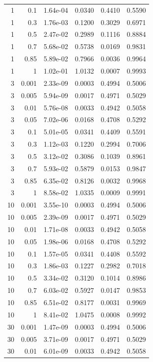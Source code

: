 {\begin{longtable}{rrrrrr}
1 & 0.1 & 1.64e-04 & 0.0340 & 0.4410 & 0.5590 \\
1 & 0.3 & 1.76e-03 & 0.1200 & 0.3029 & 0.6971 \\
1 & 0.5 & 2.47e-02 & 0.2989 & 0.1116 & 0.8884 \\
1 & 0.7 & 5.68e-02 & 0.5738 & 0.0169 & 0.9831 \\
1 & 0.85 & 5.89e-02 & 0.7966 & 0.0036 & 0.9964 \\
1 & 1 & 1.02e-01 & 1.0132 & 0.0007 & 0.9993 \\
3 & 0.001 & 2.33e-09 & 0.0003 & 0.4994 & 0.5006 \\
3 & 0.005 & 5.94e-09 & 0.0017 & 0.4971 & 0.5029 \\
3 & 0.01 & 5.76e-08 & 0.0033 & 0.4942 & 0.5058 \\
3 & 0.05 & 7.02e-06 & 0.0168 & 0.4708 & 0.5292 \\
3 & 0.1 & 5.01e-05 & 0.0341 & 0.4409 & 0.5591 \\
3 & 0.3 & 1.12e-03 & 0.1220 & 0.2994 & 0.7006 \\
3 & 0.5 & 3.12e-02 & 0.3086 & 0.1039 & 0.8961 \\
3 & 0.7 & 5.93e-02 & 0.5879 & 0.0153 & 0.9847 \\
3 & 0.85 & 6.35e-02 & 0.8126 & 0.0032 & 0.9968 \\
3 & 1 & 8.58e-02 & 1.0335 & 0.0009 & 0.9991 \\
10 & 0.001 & 3.55e-10 & 0.0003 & 0.4994 & 0.5006 \\
10 & 0.005 & 2.39e-09 & 0.0017 & 0.4971 & 0.5029 \\
10 & 0.01 & 1.71e-08 & 0.0033 & 0.4942 & 0.5058 \\
10 & 0.05 & 1.98e-06 & 0.0168 & 0.4708 & 0.5292 \\
10 & 0.1 & 1.57e-05 & 0.0341 & 0.4408 & 0.5592 \\
10 & 0.3 & 1.86e-03 & 0.1227 & 0.2982 & 0.7018 \\
10 & 0.5 & 3.34e-02 & 0.3120 & 0.1014 & 0.8986 \\
10 & 0.7 & 6.03e-02 & 0.5927 & 0.0147 & 0.9853 \\
10 & 0.85 & 6.51e-02 & 0.8177 & 0.0031 & 0.9969 \\
10 & 1 & 8.41e-02 & 1.0475 & 0.0008 & 0.9992 \\
30 & 0.001 & 1.47e-09 & 0.0003 & 0.4994 & 0.5006 \\
30 & 0.005 & 3.71e-09 & 0.0017 & 0.4971 & 0.5029 \\
30 & 0.01 & 6.01e-09 & 0.0033 & 0.4942 & 0.5058 \\

\end{longtable}}
